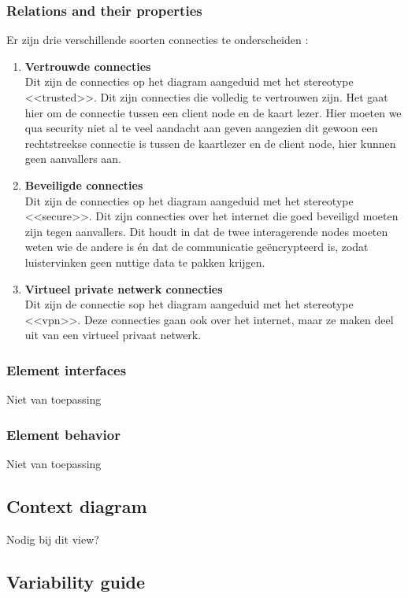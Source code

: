 \documentclass[a4paper,10pt]{paper}
\begin{document}
\subsubsection{Relations and their properties}
Er zijn drie verschillende soorten connecties te onderscheiden : 
\begin{enumerate}
 \item \textbf{Vertrouwde connecties}\\
Dit zijn de connecties op het diagram aangeduid met het stereotype <<trusted>>. Dit zijn
connecties die volledig te vertrouwen zijn. Het gaat hier om de connectie tussen een client
node en de kaart lezer. Hier moeten we qua security niet al te veel aandacht aan geven
aangezien dit gewoon een rechtstreekse connectie is tussen de kaartlezer en de client node,
hier kunnen geen aanvallers aan.
\item \textbf{Beveiligde connecties}\\
Dit zijn de connecties op het diagram aangeduid met het stereotype <<secure>>. Dit zijn
connecties over het internet die goed beveiligd moeten zijn tegen aanvallers. Dit houdt
in dat de twee interagerende nodes moeten weten wie de andere is én dat de communicatie
geëncrypteerd is, zodat luistervinken geen nuttige data te pakken krijgen.
\item \textbf{Virtueel private netwerk connecties}\\
Dit zijn de connectie sop het diagram aangeduid met het stereotype <<vpn>>. Deze connecties
gaan ook over het internet, maar ze maken deel uit van een virtueel privaat netwerk.
\end{enumerate}

\subsubsection{Element interfaces}

Niet van toepassing

\subsubsection{Element behavior}

Niet van toepassing

\subsection{Context diagram}

Nodig bij dit view?

\subsection{Variability guide}
\end{document}
